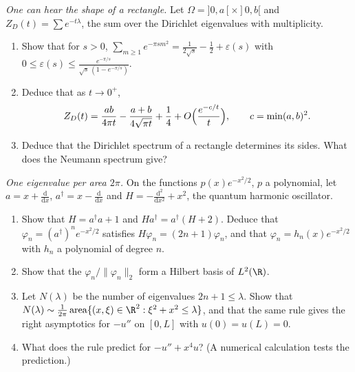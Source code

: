 \begin{exercise}[$\star\star\star$]\label{pb:heatrect}
\emph{One can hear the shape of a rectangle.} Let $\Omega=]0,a[\times]0,b[$ and $Z_D(t)=\sum e^{-t\lambda}$, the sum over the Dirichlet eigenvalues with multiplicity.
\begin{enumerate}[label=(\alph*)]
\item Show that for $s>0$, $\sum_{m\ge1}e^{-\pi sm^2}=\frac1{2\sqrt s}-\frac12+\varepsilon(s)$ with $0\le\varepsilon(s)\le\frac{e^{-\pi/s}}{\sqrt s\,(1-e^{-\pi/s})}$.
\item Deduce that as $t\to0^+$,
\[
Z_D(t)=\frac{ab}{4\pi t}-\frac{a+b}{4\sqrt{\pi t}}+\frac14+O\Bigl(\frac{e^{-c/t}}t\Bigr),\qquad c=\min(a,b)^2.
\]
\item Deduce that the Dirichlet spectrum of a rectangle determines its sides. What does the Neumann spectrum give?
\end{enumerate}
\end{exercise}

\begin{exercise}[$\star\star$]\label{pb:phasespace}
\emph{One eigenvalue per area $2\pi$.} On the functions $p(x)e^{-x^2/2}$, $p$ a polynomial, let $a=x+\frac{\mathrm d}{\mathrm dx}$, $a^\dagger=x-\frac{\mathrm d}{\mathrm dx}$ and
$H=-\frac{\mathrm d^2}{\mathrm dx^2}+x^2$, the quantum harmonic oscillator.
\begin{enumerate}[label=(\alph*)]
\item Show that $H=a^\dagger a+1$ and $Ha^\dagger=a^\dagger(H+2)$. Deduce that $\varphi_n=(a^\dagger)^ne^{-x^2/2}$ satisfies $H\varphi_n=(2n+1)\varphi_n$, and that $\varphi_n=h_n(x)e^{-x^2/2}$ with $h_n$ a
polynomial of degree $n$.
\item Show that the $\varphi_n/\|\varphi_n\|_2$ form a Hilbert basis of $L^2(\R)$.
\item Let $N(\lambda)$ be the number of eigenvalues $2n+1\le\lambda$. Show that $N(\lambda)\sim\frac1{2\pi}\operatorname{area}\{(x,\xi)\in\R^2:\xi^2+x^2\le\lambda\}$, and that the same rule gives the
right asymptotics for $-u''$ on $[0,L]$ with $u(0)=u(L)=0$.
\item What does the rule predict for $-u''+x^4u$? (A numerical calculation tests the prediction.)
\end{enumerate}
\end{exercise}

